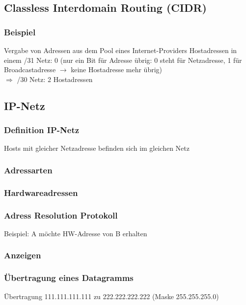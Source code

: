 \subsection{Classless Interdomain Routing (CIDR)}
\subsubsection*{Beispiel}
Vergabe von Adressen aus dem Pool eines Internet-Providers
Hostadressen in einem /31 Netz: 0 (nur ein Bit für Adresse übrig: 0 steht für Netzadresse, 1 für Broadcastadresse $\to$ keine Hostadresse mehr übrig)\\
$\Rightarrow$ /30 Netz: 2 Hostadressen
\subsection{IP-Netz}
\subsubsection{Definition IP-Netz}
Hosts mit gleicher Netzadresse befinden sich im gleichen Netz
\subsubsection{Adressarten}
\subsubsection{Hardwareadressen}
\subsubsection{Adress Resolution Protokoll}
Beispiel: A möchte HW-Adresse von B erhalten
\subsubsection*{Anzeigen}
\subsubsection{Übertragung eines Datagramms}
Übertragung 111.111.111.111 zu 222.222.222.222 (Maske 255.255.255.0)









